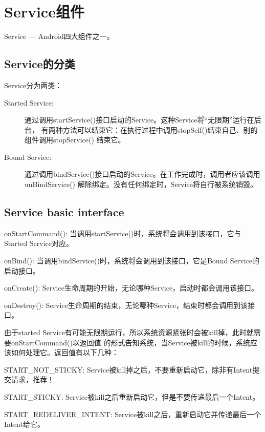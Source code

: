 
\section[Service组件]{Service组件}
Service --- Android四大组件之一。

\subsection[Service的分类]{Service的分类}
Service分为两类：\par
\begin{description}
  \item[Started Service:] 通过调用startService()接口启动的Service。这种Service将“无限期”运行在后台，
                          有两种方法可以结束它：在执行过程中调用stopSelf()结束自己、别的组件调用stopService() 结束它。
  \item[Bound Service:] 通过调用bindService()接口启动的Service。在工作完成时，调用者应该调用unBindService()
                        解除绑定。没有任何绑定时，Service将自行被系统销毁。
\end{description}

\subsection[Service basic interface]{Service basic interface}
\begin{coloredenumerate}
  \item onStartCommand(): 当调用startService()时，系统将会调用到该接口，它与Started Service对应。
  \item onBind(): 当调用bindService()时，系统将会调用到该接口，它是Bound Service的启动接口。
  \item onCreate(): Service生命周期的开始，无论哪种Service，启动时都会调用该接口。
  \item onDestroy(): Service生命周期的结束，无论哪种Service，结束时都会调用到该接口。
\end{coloredenumerate}

由于started Service有可能无限期运行，所以系统资源紧张时会被kill掉，此时就需要onStartCommand()以返回值
的形式告知系统，当Service被kill的时候，系统应该如何处理它。返回值有以下几种：\par
\begin{coloredenumerate}
  \item START\_NOT\_STICKY: Service被kill掉之后，不要重新启动它，除非有Intent提交请求，推荐！
  \item START\_STICKY: Service被kill之后重新启动它，但是不要传递最后一个Intent。
  \item START\_REDELIVER\_INTENT: Service被kill之后，重新启动它并传递最后一个Intent给它。
\end{coloredenumerate}

